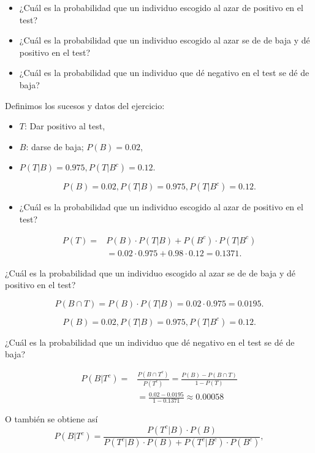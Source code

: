 \documentclass[
  letterpaper,
  DIV=11,
  numbers=noendperiod]{scrreprt}
\providecommand{\tightlist}{%
  \setlength{\itemsep}{0pt}\setlength{\parskip}{0pt}}\usepackage{longtable,booktabs,array}
\begin{document}
\begin{itemize}
\tightlist
\item
  ¿Cuál es la probabilidad que un individuo escogido al azar de positivo
  en el test?
\item
  ¿Cuál es la probabilidad que un individuo escogido al azar se de de
  baja y dé positivo en el test?
\item
  ¿Cuál es la probabilidad que un individuo que dé negativo en el test
  se dé de baja?
\end{itemize}

Definimos los sucesos y datos del ejercicio:

\begin{itemize}
\tightlist
\item
  \(T\): Dar positivo al test,
\item
  \(B\): darse de baja; \(P(B)=0.02\),
\item
  \(P(T|B)=0.975, P(T|B^c)=0.12\).
\end{itemize}

\[P(B)=0.02, P(T|B)=0.975, P(T|B^c)=0.12.\]

\begin{itemize}
\tightlist
\item
  ¿Cuál es la probabilidad que un individuo escogido al azar de positivo
  en el test?
\end{itemize}

\[
\begin{array}{rl}
P(T) = & P(B)\cdot P(T|B)+P(B^c)\cdot P(T|B^c)\\[1ex]
& =0.02\cdot 0.975+0.98\cdot 0.12=0.1371.
\end{array}
\]

¿Cuál es la probabilidad que un individuo escogido al azar se de de baja
y dé positivo en el test?

\[P(B\cap T)= P(B)\cdot P(T|B)=0.02\cdot 0.975=0.0195.\]

\[P(B)=0.02, P(T|B)=0.975, P(T|B^c)=0.12.\]

¿Cuál es la probabilidad que un individuo que dé negativo en el test se
dé de baja?

\[
\begin{array}{rl}
P(B|T^c)= &\displaystyle \frac{P(B\cap T^c)}{P(T^c)}=
\frac{P(B)-P(B\cap T)}{1-P(T)}\\[2ex] & \displaystyle =
\frac{0.02-0.0195}{1-0.1371}\approx 0.00058
\end{array}
\]

O también se obtiene así \[
    P(B|T^c)=\frac{P(T^c|B)\cdot P(B)}{P(T^c|B)\cdot P(B)+P(T^c|B^c)\cdot P(B^c)},
    \]
\end{document}
